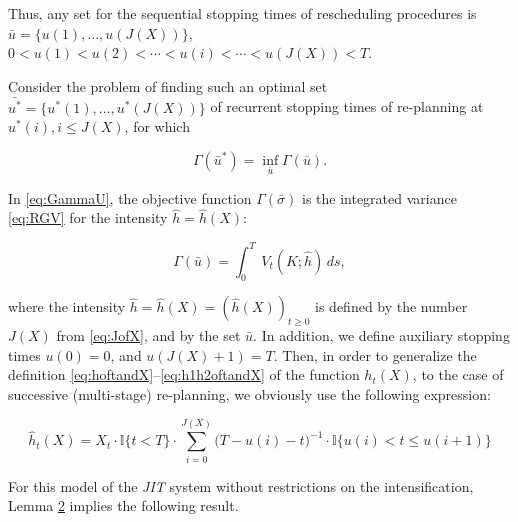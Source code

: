Thus, any set for the sequential stopping times of rescheduling procedures is $\bar{u} = \{u(1), \dotsc , u(J(X))\}$, $0<u(1)<u(2)<\dotsb<u(i)<\dotsb<u(J(X))<T$.



	Consider the problem of finding such an optimal set $\bar{u^*} = \{{u^*}(1), \dotsc , {u^*}(J(X))\}$ of recurrent stopping times of re-planning at ${u^*}(i), i \leq J(X)$, for which


\begin{equation}\label{eq:GammaU}

  \Gamma (\bar{u}^*) = \inf_{\overline{u}}\Gamma (\overline{u}).

\end{equation}

In \eqref{eq:GammaU}, the objective function ${\Gamma}(\bar{\sigma})$ is the integrated variance \eqref{eq:RGV} for the intensity 		$\hat{h} ={\hat{h}}(X)$:

\begin{equation}\label{eq:GammaInt}

 \Gamma (\bar{u}) =  \int_{0}^{T}\!\ {V_t}(K; \hat{h})\,ds,

\end{equation}

where the intensity $\hat{h} ={\hat{h}}(X) = ({\hat{h}}(X))_{t \geq 0}$ is defined by the number $J(X)$ from \eqref{eq:JofX}, and by the set $\bar{u}$. In addition, we define auxiliary stopping times $u(0) = 0$, and $u(J(X)+1) = T$.  Then, in order to generalize the definition \eqref{eq:hoftandX}--\eqref{eq:h1h2oftandX} of the function ${h_t}(X)$, to the case of successive (multi-stage) re-planning, we obviously use the following expression:

\begin{equation}\label{eq:hhatofX}

	{{\hat{h}}_t}(X) = {X_t}\cdot \mathbb{I}\{t<T\}\cdot \sum_{i=0}^{J(X)} \Big(T-u(i)-t\Big)^{-1}\cdot \mathbb{I} \{u(i)<t \leq u(i+1)\}

\end{equation}

For this model of the \emph{JIT} system without restrictions on the intensification, Lemma \hyperlink{b:l2}{2} implies the following result.



\smallskip





